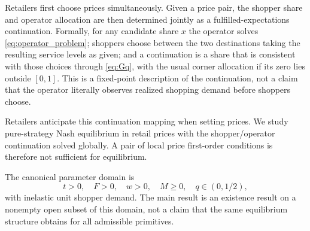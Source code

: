 Retailers first choose prices simultaneously. Given a price pair, the shopper share and operator allocation are then determined jointly as a fulfilled-expectations continuation. Formally, for any candidate share $x$ the operator solves \eqref{eq:operator_problem}; shoppers choose between the two destinations taking the resulting service levels as given; and a continuation is a share that is consistent with those choices through \eqref{eq:Gq}, with the usual corner allocation if its zero lies outside $[0,1]$. This is a fixed-point description of the continuation, not a claim that the operator literally observes realized shopping demand before shoppers choose.

Retailers anticipate this continuation mapping when setting prices. We study pure-strategy Nash equilibrium in retail prices with the shopper/operator continuation solved globally. A pair of local price first-order conditions is therefore not sufficient for equilibrium.

The canonical parameter domain is
\begin{equation}
t>0,\quad F>0,\quad w>0,\quad M\geq0,\quad q\in(0,1/2),
\end{equation}
with inelastic unit shopper demand. The main result is an existence result on a nonempty open subset of this domain, not a claim that the same equilibrium structure obtains for all admissible primitives.
